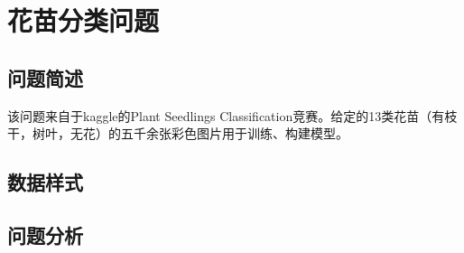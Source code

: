 \section{花苗分类问题}
\subsection{问题简述}
该问题来自于kaggle的Plant Seedlings Classification竞赛。给定的13类花苗（有枝干，树叶，无花）的五千余张彩色图片用于训练、构建模型。
\subsection{数据样式}
\subsection{问题分析}